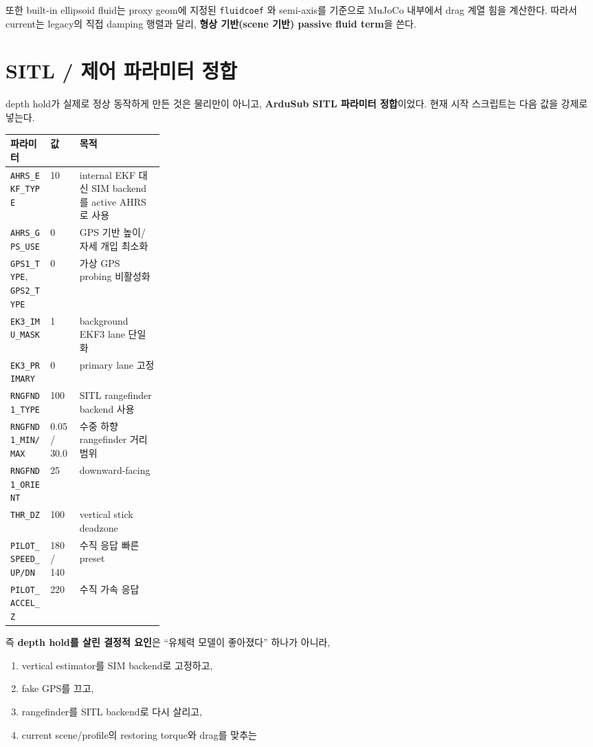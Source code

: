 \documentclass[11pt,a4paper]{article}
\newcommand{\code}[1]{\nolinkurl{#1}}
\begin{document}
또한 built-in ellipsoid fluid는 proxy geom에 지정된 \code{fluidcoef} 와 semi-axis를 기준으로 MuJoCo 내부에서 drag 계열 힘을 계산한다. 따라서 current는 legacy의 직접 damping 행렬과 달리, \textbf{형상 기반(scene 기반) passive fluid term}을 쓴다.

\section{SITL / 제어 파라미터 정합}

depth hold가 실제로 정상 동작하게 만든 것은 물리만이 아니고, \textbf{ArduSub SITL 파라미터 정합}이었다. 현재 시작 스크립트는 다음 값을 강제로 넣는다.

\begin{center}
\small
\begin{tabularx}{\linewidth}{>{\raggedright\arraybackslash}p{0.26\linewidth}YY}
\toprule
파라미터 & 값 & 목적 \\
\midrule
\code{AHRS\_EKF\_TYPE} & 10 & internal EKF 대신 SIM backend를 active AHRS로 사용 \\
\code{AHRS\_GPS\_USE} & 0 & GPS 기반 높이/자세 개입 최소화 \\
\code{GPS1\_TYPE}, \code{GPS2\_TYPE} & 0 & 가상 GPS probing 비활성화 \\
\code{EK3\_IMU\_MASK} & 1 & background EKF3 lane 단일화 \\
\code{EK3\_PRIMARY} & 0 & primary lane 고정 \\
\code{RNGFND1\_TYPE} & 100 & SITL rangefinder backend 사용 \\
\code{RNGFND1\_MIN/MAX} & 0.05 / 30.0 & 수중 하향 rangefinder 거리 범위 \\
\code{RNGFND1\_ORIENT} & 25 & downward-facing \\
\code{THR\_DZ} & 100 & vertical stick deadzone \\
\code{PILOT\_SPEED\_UP/DN} & 180 / 140 & 수직 응답 빠른 preset \\
\code{PILOT\_ACCEL\_Z} & 220 & 수직 가속 응답 \\
\bottomrule
\end{tabularx}
\end{center}

즉 \textbf{depth hold를 살린 결정적 요인}은 ``유체력 모델이 좋아졌다'' 하나가 아니라,

\begin{enumerate}[leftmargin=2em]
  \item vertical estimator를 SIM backend로 고정하고,
  \item fake GPS를 끄고,
  \item rangefinder를 SITL backend로 다시 살리고,
  \item current scene/profile의 restoring torque와 drag를 맞추는
\end{enumerate}
\end{document}
